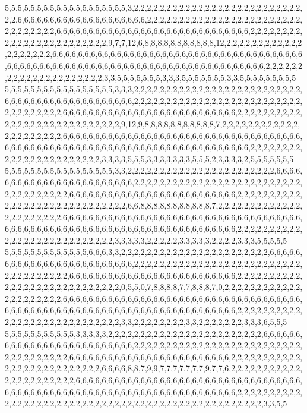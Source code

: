 5,5,5,5,5,5,5,5,5,5,5,5,5,5,5,5,5,5,5,3,2,2,2,2,2,2,2,2,2,2,2,2,2,2,2,2,2,2,2,2,2,2,2,2,2,2,2,2,6,6,6,6,6,6,6,6,6,6,6,6,6,6,6,6,6,6,6,6,2,2,2,2,2,2,2,2,2,2,2,2,2,2,2,2,2,2,2,2,2,2,2,2,2,2,2,2,2,2,2,2,6,6,6,6,6,6,6,6,6,6,6,6,6,6,6,6,6,6,6,6,6,6,6,6,6,6,6,6,6,6,2,2,2,2,2,2,2,2,2,2,2,2,2,2,2,2,2,2,2,2,2,2,2,2,9,7,7,12,6,8,8,8,8,8,8,8,8,8,8,8,12,2,2,2,2,2,2,2,2,2,2,2,2,2,2,2,2,2,2,2,6,6,6,6,6,6,6,6,6,6,6,6,6,6,6,6,6,6,6,6,6,6,6,6,6,6,6,6,6,6,6,6,6,6,6,6,6,6,6,6,6,6,6,6,6,6,6,6,6,6,6,6,6,6,6,6,6,6,6,6,6,6,6,6,6,6,6,6,6,6,6,6,6,6,6,6,6,6,6,2,2,2,2,2,2,2,2,2,2,2,2,2,2,2,2,2,2,2,2,2,3,3,5,5,5,5,5,5,5,3,3,3,5,5,5,5,5,5,5,3,3,5,5,5,5,5,5,5,5,5
5,5,5,5,5,5,5,5,5,5,5,5,5,5,5,5,5,3,3,3,2,2,2,2,2,2,2,2,2,2,2,2,2,2,2,2,2,2,2,2,2,2,2,2,2,2,6,6,6,6,6,6,6,6,6,6,6,6,6,6,6,6,6,6,6,6,2,2,2,2,2,2,2,2,2,2,2,2,2,2,2,2,2,2,2,2,2,2,2,2,2,2,2,2,2,2,2,2,2,2,2,6,6,6,6,6,6,6,6,6,6,6,6,6,6,6,6,6,6,6,6,6,6,6,6,6,6,6,2,2,2,2,2,2,2,2,2,2,2,2,2,2,2,2,2,2,2,2,2,2,2,2,2,2,2,2,9,12,9,8,8,8,8,8,8,8,8,8,8,8,7,2,2,2,2,2,2,2,2,2,2,2,2,2,2,2,2,2,2,2,2,2,6,6,6,6,6,6,6,6,6,6,6,6,6,6,6,6,6,6,6,6,6,6,6,6,6,6,6,6,6,6,6,6,6,6,6,6,6,6,6,6,6,6,6,6,6,6,6,6,6,6,6,6,6,6,6,6,6,6,6,6,6,6,6,6,6,6,6,6,6,6,6,6,6,6,6,2,2,2,2,2,2,2,2,2,2,2,2,2,2,2,2,2,2,2,2,2,2,2,3,3,3,3,5,5,5,3,3,3,3,3,3,3,5,5,5,2,3,3,3,3,2,5,5,5,5,5,5,5
5,5,5,5,5,5,5,5,5,5,5,5,5,5,5,5,5,3,3,2,2,2,2,2,2,2,2,2,2,2,2,2,2,2,2,2,2,2,2,2,2,2,6,6,6,6,6,6,6,6,6,6,6,6,6,6,6,6,6,6,6,6,6,6,6,6,2,2,2,2,2,2,2,2,2,2,2,2,2,2,2,2,2,2,2,2,2,2,2,2,2,2,2,2,2,2,2,2,2,2,2,2,6,6,6,6,6,6,6,6,6,6,6,6,6,6,6,6,6,6,6,6,6,6,6,6,6,6,2,2,2,2,2,2,2,2,2,2,2,2,2,2,2,2,2,2,2,2,2,2,2,2,2,2,2,2,2,6,6,8,8,8,8,8,8,8,8,8,8,8,7,2,2,2,2,2,2,2,2,2,2,2,2,2,2,2,2,2,2,2,2,2,2,6,6,6,6,6,6,6,6,6,6,6,6,6,6,6,6,6,6,6,6,6,6,6,6,6,6,6,6,6,6,6,6,6,6,6,6,6,6,6,6,6,6,6,6,6,6,6,6,6,6,6,6,6,6,6,6,6,6,6,6,6,6,6,6,6,6,6,6,6,6,6,6,6,2,2,2,2,2,2,2,2,2,2,2,2,2,2,2,2,2,2,2,2,2,2,2,2,2,2,2,3,3,3,3,3,2,2,2,2,2,3,3,3,3,3,2,2,2,2,3,3,3,5,5,5,5,5
5,5,5,5,5,5,5,5,5,5,5,5,5,6,6,6,3,3,2,2,2,2,2,2,2,2,2,2,2,2,2,2,2,2,2,2,2,2,2,2,2,6,6,6,6,6,6,6,6,6,6,6,6,6,6,6,6,6,6,6,6,6,6,6,6,6,2,2,2,2,2,2,2,2,2,2,2,2,2,2,2,2,2,2,2,2,2,2,2,2,2,2,2,2,2,2,2,2,2,2,2,2,6,6,6,6,6,6,6,6,6,6,6,6,6,6,6,6,6,6,6,6,6,6,6,6,6,6,2,2,2,2,2,2,2,2,2,2,2,2,2,2,2,2,2,2,2,2,2,2,2,2,2,2,2,2,0,5,5,0,7,8,8,8,8,7,7,8,8,8,7,0,2,2,2,2,2,2,2,2,2,2,2,2,2,2,2,2,2,2,2,2,2,6,6,6,6,6,6,6,6,6,6,6,6,6,6,6,6,6,6,6,6,6,6,6,6,6,6,6,6,6,6,6,6,6,6,6,6,6,6,6,6,6,6,6,6,6,6,6,6,6,6,6,6,6,6,6,6,6,6,6,6,6,6,6,6,6,6,6,6,6,6,6,6,6,2,2,2,2,2,2,2,2,2,2,2,2,2,2,2,2,2,2,2,2,2,2,2,2,2,2,2,2,3,3,2,2,2,2,2,2,2,2,3,3,2,2,2,2,2,2,2,3,3,3,6,5,5,5
5,5,5,5,5,5,5,5,5,5,5,3,3,3,3,3,2,2,2,2,2,2,2,2,2,2,2,2,2,2,2,2,2,2,2,2,2,2,2,2,6,6,6,6,6,6,6,6,6,6,6,6,6,6,6,6,6,6,6,6,6,6,6,6,6,6,2,2,2,2,2,2,2,2,2,2,2,2,2,2,2,2,2,2,2,2,2,2,2,2,2,2,2,2,2,2,2,2,2,2,2,2,6,6,6,6,6,6,6,6,6,6,6,6,6,6,6,6,6,6,6,6,6,6,6,6,6,2,2,2,2,2,2,2,2,2,2,2,2,2,2,2,2,2,2,2,2,2,2,2,2,2,2,6,6,6,6,8,8,7,9,9,7,7,7,7,7,7,7,9,7,7,6,2,2,2,2,2,2,2,2,2,2,2,2,2,2,2,2,2,2,2,2,2,2,6,6,6,6,6,6,6,6,6,6,6,6,6,6,6,6,6,6,6,6,6,6,6,6,6,6,6,6,6,6,6,6,6,6,6,6,6,6,6,6,6,6,6,6,6,6,6,6,6,6,6,6,6,6,6,6,6,6,6,6,6,6,6,6,6,6,6,6,6,6,6,2,2,2,2,2,2,2,2,2,2,2,2,2,2,2,2,2,2,2,2,2,2,2,2,2,2,2,2,2,2,2,2,2,2,2,2,2,2,2,2,2,2,2,2,2,2,2,2,2,2,3,3,5,5
